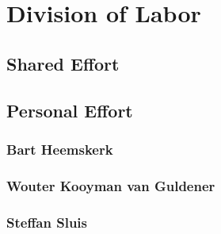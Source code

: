\chapter{Division of Labor}

\section{Shared Effort}

\section{Personal Effort}
\subsection*{Bart Heemskerk}

\subsection*{Wouter Kooyman van Guldener}

\subsection*{Steffan Sluis}
